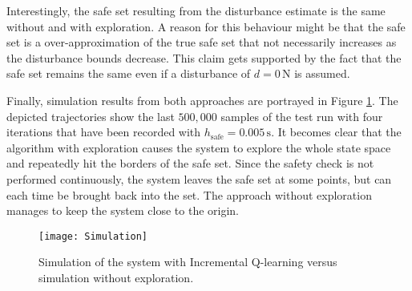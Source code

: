 \documentclass[../main.tex]{subfiles}
\begin{document}
Interestingly, the safe set resulting from the disturbance estimate is the same without and with exploration. A reason for this behaviour might be that the safe set is a over-approximation of the true safe set that not necessarily increases as the disturbance bounds decrease. This claim gets supported by the fact that the safe set remains the same even if a disturbance of $d = 0\,\text{N}$ is assumed.\par

Finally, simulation results from both approaches are portrayed in Figure \ref{fig:Simulation}. The depicted trajectories show the last $500,000$ samples of the test run with four iterations that have been recorded with $h_\text{safe} = 0.005\,\text{s}$. It becomes clear that the algorithm with exploration causes the system to explore the whole state space and repeatedly hit the borders of the safe set. Since the safety check is not performed continuously, the system leaves the safe set at some points, but can each time be brought back into the set. The approach without exploration manages to keep the system close to the origin. 

\begin{figure}
    \centering
    \texttt{[image: Simulation]}
        \caption{Simulation of the system with Incremental Q-learning versus simulation without exploration.}\label{fig:Simulation}
\end{figure}
\end{document}
